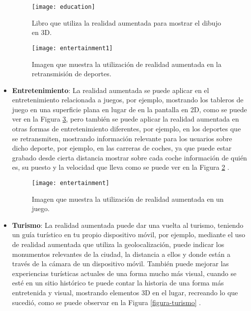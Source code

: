 \begin{itemize}
  \begin{figure}[h]
    \centering
    \texttt{[image: education]}
    \caption{Libro que utiliza la realidad aumentada para mostrar el dibujo en 3D.\protect\footnotemark}
    \label{figura-educacion}
  \end{figure}


  \begin{figure}[h]
    \centering
    \texttt{[image: entertainment1]}
    \caption{Imagen que muestra la utilización de realidad aumentada en la retransmisión de deportes. \cite{van-krevelen}}
    \label{figura-entretenimiento1}
  \end{figure}

  \item \textbf{Entretenimiento}: La realidad aumentada se puede aplicar en el entretenimiento relacionada a juegos, por ejemplo, mostrando los tableros de juego en una superficie plana en lugar de en la pantalla en 2D, como se puede ver en la Figura \ref{figura-entretenimiento}, pero también se puede aplicar la realidad aumentada en otras formas de entretenimiento diferentes, por ejemplo, en los deportes que se retransmiten, mostrando información relevante para los usuarios sobre dicho deporte, por ejemplo, en las carreras de coches, ya que puede estar grabado desde cierta distancia mostrar sobre cada coche información de quién es, su puesto y la velocidad que lleva como se puede ver en la Figura \ref{figura-entretenimiento1} \cite{van-krevelen}.

  \begin{figure}[h]
    \centering
    \texttt{[image: entertainment]}
    \caption{Imagen que muestra la utilización de realidad aumentada en un juego.\protect\footnotemark}
    \label{figura-entretenimiento}
  \end{figure}


  \item \textbf{Turismo}: La realidad aumentada puede dar una vuelta al turismo, teniendo un guía turístico en tu propio dispositivo móvil, por ejemplo, mediante el uso de realidad aumentada que utiliza la geolocalización, puede indicar los monumentos relevantes de la ciudad, la distancia a ellos y donde están a través de la cámara de un dispositivo móvil. También puede mejorar las experiencias turísticas actuales de una forma mucho más visual, cuando se esté en un sitio histórico te puede contar la historia de una forma más entretenida y visual, mostrando elementos 3D en el lugar, recreando lo que sucedió, como se puede observar en la Figura \ref{figura-turismo} \cite{reinoso}.


\end{itemize}
